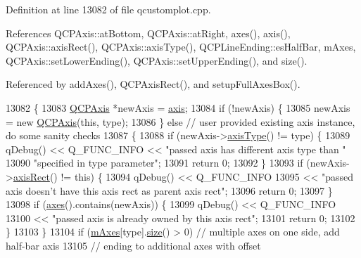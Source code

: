 Definition at line 13082 of file qcustomplot.\+cpp.



References Q\+C\+P\+Axis\+::at\+Bottom, Q\+C\+P\+Axis\+::at\+Right, axes(), axis(), Q\+C\+P\+Axis\+::axis\+Rect(), Q\+C\+P\+Axis\+::axis\+Type(), Q\+C\+P\+Line\+Ending\+::es\+Half\+Bar, m\+Axes, Q\+C\+P\+Axis\+::set\+Lower\+Ending(), Q\+C\+P\+Axis\+::set\+Upper\+Ending(), and size().



Referenced by add\+Axes(), Q\+C\+P\+Axis\+Rect(), and setup\+Full\+Axes\+Box().


\begin{DoxyCode}
13082                                                                  \{
13083   \hyperlink{class_q_c_p_axis}{QCPAxis} *newAxis = \hyperlink{class_q_c_p_axis_rect_a560de44e47a4af0f86c59102a094b1e4}{axis};
13084   \textcolor{keywordflow}{if} (!newAxis) \{
13085     newAxis = \textcolor{keyword}{new} \hyperlink{class_q_c_p_axis}{QCPAxis}(\textcolor{keyword}{this}, type);
13086   \} \textcolor{keywordflow}{else} \textcolor{comment}{// user provided existing axis instance, do some sanity checks}
13087   \{
13088     \textcolor{keywordflow}{if} (newAxis->\hyperlink{class_q_c_p_axis_a593c37bf6aa4990326dc09e24f45db7f}{axisType}() != type) \{
13089       qDebug() << Q\_FUNC\_INFO << \textcolor{stringliteral}{"passed axis has different axis type than "}
13090                                  \textcolor{stringliteral}{"specified in type parameter"};
13091       \textcolor{keywordflow}{return} 0;
13092     \}
13093     \textcolor{keywordflow}{if} (newAxis->\hyperlink{class_q_c_p_axis_aada3102af43b029e3879bcbf2bddfabb}{axisRect}() != \textcolor{keyword}{this}) \{
13094       qDebug() << Q\_FUNC\_INFO
13095                << \textcolor{stringliteral}{"passed axis doesn't have this axis rect as parent axis rect"};
13096       \textcolor{keywordflow}{return} 0;
13097     \}
13098     \textcolor{keywordflow}{if} (\hyperlink{class_q_c_p_axis_rect_a18dcdc0dd6c7520bc9f3d15a7a3feec2}{axes}().contains(newAxis)) \{
13099       qDebug() << Q\_FUNC\_INFO
13100                << \textcolor{stringliteral}{"passed axis is already owned by this axis rect"};
13101       \textcolor{keywordflow}{return} 0;
13102     \}
13103   \}
13104   \textcolor{keywordflow}{if} (\hyperlink{class_q_c_p_axis_rect_ac2cb3ba9a25b733883afc3bd25f7d82b}{mAxes}[type].\hyperlink{class_q_c_p_axis_rect_a871b9fe49e92b39a3cbe29a59e458536}{size}() > 0) \textcolor{comment}{// multiple axes on one side, add half-bar axis}
13105                               \textcolor{comment}{// ending to additional axes with offset}

\end{DoxyCode}
